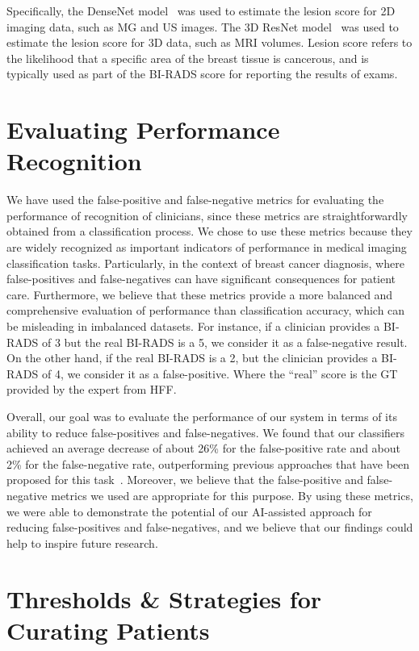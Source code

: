 Specifically, the DenseNet model~\cite{8721151} was used to estimate the lesion score for 2D imaging data, such as \ac{MG} and \ac{US} images.
The 3D ResNet model~\cite{Aldoj2020} was used to estimate the lesion score for 3D data, such as \ac{MRI} volumes.
Lesion score refers to the likelihood that a specific area of the breast tissue is cancerous, and is typically used as part of the \ac{BI-RADS} score for reporting the results of exams.

\section{Evaluating Performance Recognition}
\label{sec:app005013}

We have used the false-positive and false-negative metrics for evaluating the performance of recognition of clinicians, since these metrics are straightforwardly obtained from a classification process.
We chose to use these metrics because they are widely recognized as important indicators of performance in medical imaging classification tasks.
Particularly, in the context of breast cancer diagnosis, where false-positives and false-negatives can have significant consequences for patient care.
Furthermore, we believe that these metrics provide a more balanced and comprehensive evaluation of performance than classification accuracy, which can be misleading in imbalanced datasets.
For instance, if a clinician provides a \ac{BI-RADS} of 3 but the real \ac{BI-RADS} is a 5, we consider it as a false-negative result.
On the other hand, if the real \ac{BI-RADS} is a 2, but the clinician provides a \ac{BI-RADS} of 4, we consider it as a false-positive.
Where the ``real'' score is the \ac{GT} provided by the expert from \ac{HFF}.

Overall, our goal was to evaluate the performance of our system in terms of its ability to reduce false-positives and false-negatives.
We found that our classifiers achieved an average decrease of about 26\% for the false-positive rate and about 2\% for the false-negative rate, outperforming previous approaches that have been proposed for this task~\cite{CALISTO2022102285}.
Moreover, we believe that the false-positive and false-negative metrics we used are appropriate for this purpose.
By using these metrics, we were able to demonstrate the potential of our \ac{AI}-assisted approach for reducing false-positives and false-negatives, and we believe that our findings could help to inspire future research.

\section{Thresholds \& Strategies for Curating Patients}
\label{sec:app005014}


